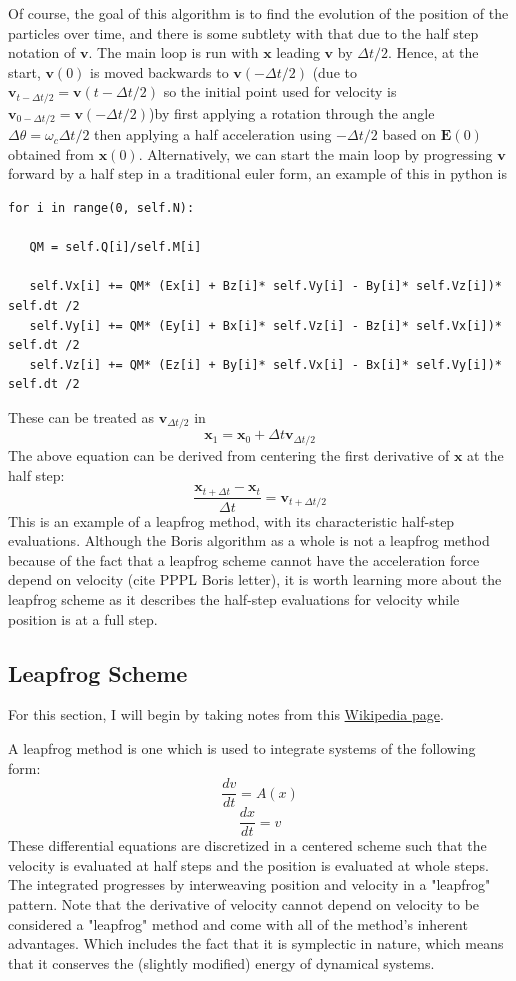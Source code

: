 \documentclass[12pt]{article}
\begin{document}
Of course, the goal of this algorithm is to find the evolution of the position of the particles over time, and there is some subtlety with that due to the half step notation of $\textbf{v}$. The main loop is run with $\textbf{x}$ leading $\textbf{v}$ by $\Delta t/2$. Hence, at the start, $\textbf{v}(0)$ is moved backwards to $\textbf{v}(-\Delta t/2)$ (due to $\textbf{v}_{t-\Delta t/2}=\textbf{v}(t-\Delta t/2)$ so the initial point used for velocity is $\textbf{v}_{0-\Delta t/2}=\textbf{v}(-\Delta t/2)$)by first applying a rotation through the angle $\Delta\theta=\omega_c\Delta t/2$ then applying a half acceleration using $-\Delta t/2$ based on $\textbf{E}(0)$ obtained from $\textbf{x}(0)$. Alternatively, we can start the main loop by progressing $\textbf{v}$ forward by a half step in a traditional euler form, an example of this in python is
\begin{verbatim}
for i in range(0, self.N):
            
   QM = self.Q[i]/self.M[i]
            
   self.Vx[i] += QM* (Ex[i] + Bz[i]* self.Vy[i] - By[i]* self.Vz[i])* self.dt /2
   self.Vy[i] += QM* (Ey[i] + Bx[i]* self.Vz[i] - Bz[i]* self.Vx[i])* self.dt /2
   self.Vz[i] += QM* (Ez[i] + By[i]* self.Vx[i] - Bx[i]* self.Vy[i])* self.dt /2
\end{verbatim}
These can be treated as $\textbf{v}_{\Delta t/2}$ in 
$$\textbf{x}_1=\textbf{x}_0+\Delta t\textbf{v}_{\Delta t/2}$$
The above equation can be derived from centering the first derivative of $\textbf{x}$ at the half step:
\begin{equation}\label{finitevel}
\frac{\textbf{x}_{t+\Delta t}-\textbf{x}_t}{\Delta t}=\textbf{v}_{t+\Delta t/2}
\end{equation}
This is an example of a leapfrog method, with its characteristic half-step evaluations. Although the Boris algorithm as a whole is not a leapfrog method because of the fact that a leapfrog scheme cannot have the acceleration force depend on velocity (cite PPPL Boris letter), it is worth learning more about the leapfrog scheme as it describes the half-step evaluations for velocity while position is at a full step.
\subsection{Leapfrog Scheme}
For this section, I will begin by taking notes from this \href{https://en.wikipedia.org/wiki/Leapfrog_integration}{Wikipedia page}. 

A leapfrog method is one which is used to integrate systems of the following form:
$$\frac{dv}{dt}=A(x)$$
$$\frac{dx}{dt}=v$$
These differential equations are discretized in a centered scheme such that the velocity is evaluated at half steps and the position is evaluated at whole steps. The integrated progresses by interweaving position and velocity in a "leapfrog" pattern. Note that the derivative of velocity cannot depend on velocity to be considered a "leapfrog" method and come with all of the method's inherent advantages. Which includes the fact that it is symplectic in nature, which means that it conserves the (slightly modified) energy of dynamical systems.
\end{document}

